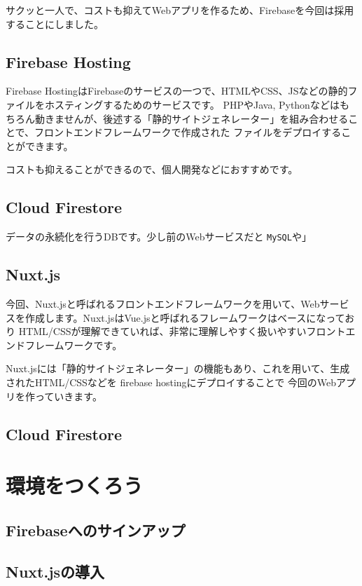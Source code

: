 サクッと一人で、コストも抑えてWebアプリを作るため、Firebaseを今回は採用することにしました。

\subsection*{Firebase Hosting}
\label{sec:1-1-2}

Firebase HostingはFirebaseのサービスの一つで、HTMLやCSS、JSなどの静的ファイルをホスティングするためのサービスです。
PHPやJava, Pythonなどはもちろん動きませんが、後述する「静的サイトジェネレーター」を組み合わせることで、フロントエンドフレームワークで作成された
ファイルをデプロイすることができます。

コストも抑えることができるので、個人開発などにおすすめです。

\subsection*{Cloud Firestore}
\label{sec:1-1-3}

データの永続化を行うDBです。少し前のWebサービスだと \texttt{MySQL}や」

\subsection*{Nuxt.js}
\label{sec:1-1-4}

今回、Nuxt.jsと呼ばれるフロントエンドフレームワークを用いて、Webサービスを作成します。Nuxt.jsはVue.jsと呼ばれるフレームワークはベースになっており
HTML/CSSが理解できていれば、非常に理解しやすく扱いやすいフロントエンドフレームワークです。

Nuxt.jsには「静的サイトジェネレーター」の機能もあり、これを用いて、生成されたHTML/CSSなどを firebase hostingにデプロイすることで
今回のWebアプリを作っていきます。

\subsection*{Cloud Firestore}
\label{sec:1-1-5}

\section{環境をつくろう}
\label{sec:1-2}

\subsection*{Firebaseへのサインアップ}
\label{sec:1-2-1}

\subsection*{Nuxt.jsの導入}
\label{sec:1-2-2}
